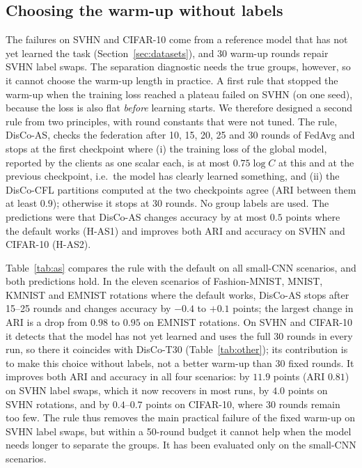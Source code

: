 \subsection{Choosing the warm-up without labels}\label{sec:warmup}
The failures on SVHN and CIFAR-10 come from a reference model that has not yet learned the task (Section~\ref{sec:datasets}), and 30 warm-up rounds repair SVHN label swaps. The separation diagnostic needs the true groups, however, so it cannot choose the warm-up length in practice. A first rule that stopped the warm-up when the training loss reached a plateau failed on SVHN (on one seed), because the loss is also flat \emph{before} learning starts. We therefore designed a second rule from two principles, with round constants that were not tuned. The rule, DisCo-AS, checks the federation after 10, 15, 20, 25 and 30 rounds of FedAvg and stops at the first checkpoint where (i) the training loss of the global model, reported by the clients as one scalar each, is at most $0.75\log C$ at this and at the previous checkpoint, i.e.\ the model has clearly learned something, and (ii) the DisCo-CFL partitions computed at the two checkpoints agree (ARI between them at least $0.9$); otherwise it stops at 30 rounds. No group labels are used. The predictions were that DisCo-AS changes accuracy by at most $0.5$ points where the default works (H-AS1) and improves both ARI and accuracy on SVHN and CIFAR-10 (H-AS2).

Table~\ref{tab:as} compares the rule with the default on all small-CNN scenarios, and both predictions hold. In the eleven scenarios of Fashion-MNIST, MNIST, KMNIST and EMNIST rotations where the default works, DisCo-AS stops after 15--25 rounds and changes accuracy by $-0.4$ to $+0.1$ points; the largest change in ARI is a drop from $0.98$ to $0.95$ on EMNIST rotations. On SVHN and CIFAR-10 it detects that the model has not yet learned and uses the full 30 rounds in every run, so there it coincides with DisCo-T30 (Table~\ref{tab:other}); its contribution is to make this choice without labels, not a better warm-up than 30 fixed rounds. It improves both ARI and accuracy in all four scenarios: by $11.9$ points (ARI $0.81$) on SVHN label swaps, which it now recovers in most runs, by $4.0$ points on SVHN rotations, and by $0.4$--$0.7$ points on CIFAR-10, where 30 rounds remain too few. The rule thus removes the main practical failure of the fixed warm-up on SVHN label swaps, but within a 50-round budget it cannot help when the model needs longer to separate the groups. It has been evaluated only on the small-CNN scenarios.

\begin{table}[!htbp]
\centering
\caption{Fixed 10-round warm-up (DisCo) against the label-free stable warm-up (DisCo-AS), on all small-CNN scenarios (5 seeds; sweeps 3 seeds). $\Delta$: difference in mean accuracy (points). $T_0$: warm-up length chosen by DisCo-AS. FMNIST: Fashion-MNIST; QS: quantity skew; part.: participation.}\label{tab:as}

\end{table}
